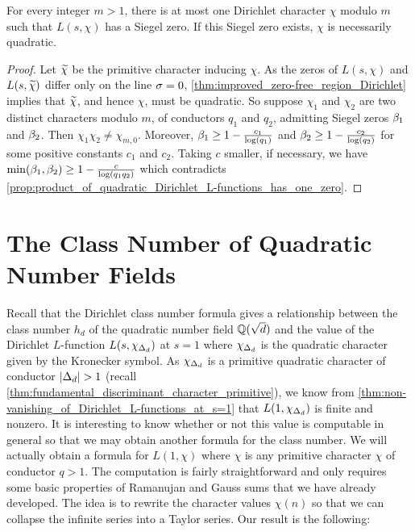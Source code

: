     \begin{proposition}\label{prop:at_most_one_Siegel_zero_per_modulus}
      For every integer $m > 1$, there is at most one Dirichlet character $\chi$ modulo $m$ such that $L(s,\chi)$ has a Siegel zero. If this Siegel zero exists, $\chi$ is necessarily quadratic.
    \end{proposition}
    \begin{proof}
      Let $\widetilde{\chi}$ be the primitive character inducing $\chi$. As the zeros of $L(s,\chi)$ and $L(s,\widetilde{\chi})$ differ only on the line $\sigma = 0$, \cref{thm:improved_zero-free_region_Dirichlet} implies that $\widetilde{\chi}$, and hence $\chi$, must be quadratic. So suppose $\chi_{1}$ and $\chi_{2}$ are two distinct characters modulo $m$, of conductors $q_{1}$ and $q_{2}$, admitting Siegel zeros $\beta_{1}$ and $\beta_{2}$. Then $\chi_{1}\chi_{2} \neq \chi_{m,0}$. Moreover, $\beta_{1} \ge 1-\frac{c_{1}}{\log(q_{1})}$ and $\beta_{2} \ge 1-\frac{c_{2}}{\log(q_{2})}$ for some positive constants $c_{1}$ and $c_{2}$. Taking $c$ smaller, if necessary, we have $\min(\beta_{1},\beta_{2}) \ge 1-\frac{c}{\log(q_{1}q_{2})}$ which contradicts \cref{prop:product_of_quadratic_Dirichlet_L-functions_has_one_zero}.
    \end{proof}
  \section{The Class Number of Quadratic Number Fields}
    Recall that the Dirichlet class number formula gives a relationship between the class number $h_{d}$ of the quadratic number field $\mathbb{Q}(\sqrt{d})$ and the value of the Dirichlet $L$-function $L(s,\chi_{\Delta_{d}})$ at $s = 1$ where $\chi_{\Delta_{d}}$ is the quadratic character given by the Kronecker symbol. As $\chi_{\Delta_{d}}$ is a primitive quadratic character of conductor $|\Delta_{d}| > 1$ (recall \cref{thm:fundamental_discriminant_character_primitive}), we know from \cref{thm:non-vanishing_of_Dirichlet_L-functions_at_s=1} that $L(1,\chi_{\Delta_{d}})$ is finite and nonzero. It is interesting to know whether or not this value is computable in general so that we may obtain another formula for the class number. We will actually obtain a formula for $L(1,\chi)$ where $\chi$ is any primitive character $\chi$ of conductor $q > 1$. The computation is fairly straightforward and only requires some basic properties of Ramanujan and Gauss sums that we have already developed. The idea is to rewrite the character values $\chi(n)$ so that we can collapse the infinite series into a Taylor series. Our result is the following:
    
